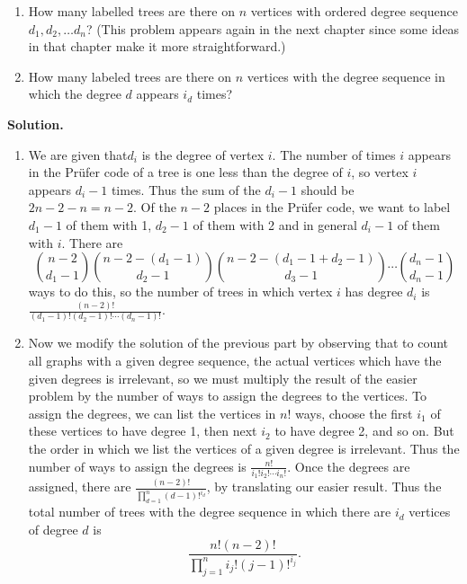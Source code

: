 \documentclass[10pt,]{book}
\theoremstyle{plain}
\theoremstyle{definition}
\theoremstyle{definition}
\numberwithin{equation}{chapter}
\begin{document}
\begin{exerciselist}
\begin{enumerate}[label=(\alph*)]
\item\hypertarget{li-38}{}How many labelled trees are there on \(n\) vertices with ordered degree sequence \(d_1,d_2,\ldots d_n\)? (This problem appears again in the next chapter since some ideas in that chapter make it more straightforward.)%
\item\hypertarget{li-39}{}How many labeled trees are there on \(n\) vertices with the degree sequence in which the degree \(d\) appears \(i_d\) times?%
\end{enumerate}
%
\par\smallskip
\par\smallskip
\noindent\textbf{Solution.}\hypertarget{solution-189}{}\quad
\leavevmode%
\begin{enumerate}[label=(\alph*)]
\item\hypertarget{li-40}{}We are given that\(d_i\) is the degree of vertex \(i\). The number of times \(i\) appears in the Prüfer code of a tree is one less than the degree of \(i\), so vertex \(i\) appears \(d_i-1\) times. Thus the sum of the \(d_i-1\) should be \(2n-2-n=n-2\). Of the \(n-2\) places in the Prüfer code, we want to label \(d_1-1\) of them with 1, \(d_2-1\) of them with 2 and in general \(d_i-1\) of them with \(i\). There are%
\begin{equation*}
\binom{n-2}{d_1-1}\binom{n-2-(d_1-1)}{d_2-1}\binom{n-2-(d_1-1+d_2-1)}{d_3-1}\cdots\binom{d_n-1}{d_n-1}
\end{equation*}
ways to do this, so the number of trees in which vertex \(i\) has degree \(d_i\) is \(\frac{(n-2)!}{(d_1-1)!(d_2-1)!\cdots(d_n-1)!}\).%
\item\hypertarget{li-41}{}Now we modify the solution of the previous part by observing that to count all graphs with a given degree sequence, the actual vertices which have the given degrees is irrelevant, so we must multiply the result of the easier problem by the number of ways to assign the degrees to the vertices. To assign the degrees, we can list the vertices in \(n!\) ways, choose the first \(i_1\) of these vertices to have degree 1, then next \(i_2\) to have degree 2, and so on. But the order in which we list the vertices of a given degree is irrelevant. Thus the number of ways to assign the degrees is \(\frac{n!}{i_1!i_2!\cdots i_n!}\). Once the degrees are assigned, there are \(\frac{(n-2)!}{\prod_{d=1}^n (d-1)!^{i_d}}\), by translating our easier result. Thus the total number of trees with the degree sequence in which there are \(i_d\) vertices of degree \(d\) is%
\begin{equation*}
\frac{n!(n-2)!}{\prod_{j=1}^n i_j!(j-1)!^{i_j}}\text{.}
\end{equation*}
%
\end{enumerate}
%
\end{exerciselist}
\typeout{************************************************}
\typeout{************************************************}
\end{document}
